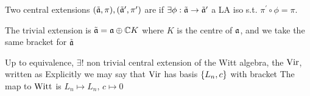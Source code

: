 \documentclass{article}
\begin{document}
\begin{definition}
Two central extensions $(\tilde{\mathfrak{a}},\pi), (\tilde{\mathfrak{a}}^\prime,\pi^\prime)$ are  if $\exists \phi : \tilde{\mathfrak{a}} \to \tilde{\mathfrak{a}}^\prime$ a LA iso s.t. $\pi^\prime \circ \phi = \pi$.
\end{definition}

\begin{example}
The trivial extension is $\tilde{\mathfrak{a}} = \mathfrak{a} \oplus \mathbb{C}K$ where $K$ is the centre of $\mathfrak{a}$, and we take the same bracket for $\tilde{\mathfrak{a}}$
\end{example}

\begin{prop}
Up to equivalence, $\exists !$ non trivial central extension of the Witt algebra, the  $\operatorname{Vir}$, written as 
Explicitly we may say that $\operatorname{Vir}$ has basis $\left\{ L_n,c \right\}$ with bracket
The map to $\operatorname{Witt}$ is $L_n \mapsto L_n, \, c \mapsto 0$
\end{prop}
\end{document}

